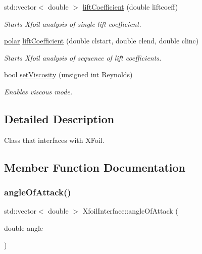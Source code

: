 \begin{DoxyCompactItemize}
std\+::vector$<$ double $>$ \hyperlink{classXfoilInterface_a7dbc26399dc54c42d5e71d0d7cbb2d07}{lift\+Coefficient} (double liftcoeff)
\begin{DoxyCompactList}\small\item\em Starts Xfoil analysis of single lift coefficient. \end{DoxyCompactList}\item 
\hyperlink{classpolar}{polar} \hyperlink{classXfoilInterface_a04e40003487d76af5f29be2a26103fd3}{lift\+Coefficient} (double clstart, double clend, double clinc)
\begin{DoxyCompactList}\small\item\em Starts Xfoil analysis of sequence of lift coefficients. \end{DoxyCompactList}\item 
\mbox{\label{classXfoilInterface_a80e8724704363aa11365f79b338bf20c}} 
bool \hyperlink{classXfoilInterface_a80e8724704363aa11365f79b338bf20c}{set\+Viscosity} (unsigned int Reynolds)
\begin{DoxyCompactList}\small\item\em Enables viscous mode. \end{DoxyCompactList}\end{DoxyCompactItemize}


\subsection{Detailed Description}
Class that interfaces with X\+Foil. 

\subsection{Member Function Documentation}
\mbox{\label{classXfoilInterface_a7937559afde3fe6880b64b4d8b278256}} 
\subsubsection{\texorpdfstring{angle\+Of\+Attack()}{AngleOfAttack()}\hspace{0.1cm}{\footnotesize\ttfamily [1/2]}}
{\footnotesize\ttfamily std\+::vector$<$ double $>$ Xfoil\+Interface\+::angle\+Of\+Attack (\begin{DoxyParamCaption}\item[{double}]{angle }\end{DoxyParamCaption})}



